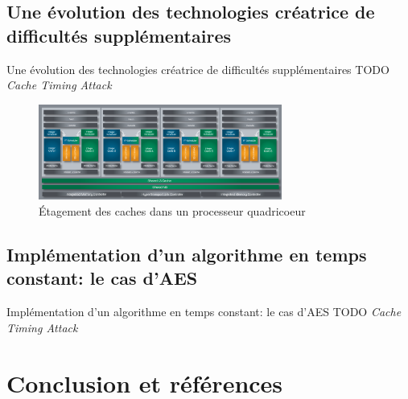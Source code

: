 \documentclass[11pt]{beamer}
\begin{document}
\subsection{Une évolution des technologies créatrice de difficultés supplémentaires}
\begin{frame}{Une évolution des technologies créatrice de difficultés supplémentaires}
TODO \emph{Cache Timing Attack} 
\begin{figure}[h]
  \centering
  \includegraphics[width=8cm]{figures/BDArch.png}
  \caption{Étagement des caches dans un processeur quadricoeur}
  \label{etagement} 
\end{figure}
\end{frame}

\subsection{Implémentation d'un algorithme en temps constant: le cas d'AES}
\begin{frame}{Implémentation d'un algorithme en temps constant: le cas d'AES}
TODO \emph{Cache Timing Attack} 
\end{frame}

\section*{Conclusion et  références}
\end{document}
